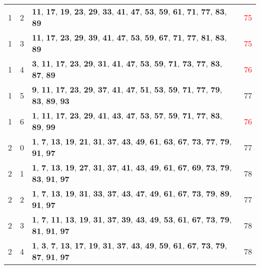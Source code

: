 \documentclass{article}
\begin{document}
\begin{tabular}{||c|c|l|c||}
	1&2&\textbf{11}, \textbf{17}, \textbf{19}, \textbf{23}, \textbf{29}, \textbf{33}, \textbf{41}, \textbf{47}, \textbf{53}, \textbf{59}, \textbf{61}, \textbf{71}, \textbf{77}, \textbf{83}, \textbf{89}&\textcolor{red}{75}\\
	1&3&\textbf{11}, \textbf{17}, \textbf{23}, \textbf{29}, \textbf{39}, \textbf{41}, \textbf{47}, \textbf{53}, \textbf{59}, \textbf{67}, \textbf{71}, \textbf{77}, \textbf{81}, \textbf{83}, \textbf{89}&\textcolor{red}{75}\\
	1&4&\textbf{3}, \textbf{11}, \textbf{17}, \textbf{23}, \textbf{29}, \textbf{31}, \textbf{41}, \textbf{47}, \textbf{53}, \textbf{59}, \textbf{71}, \textbf{73}, \textbf{77}, \textbf{83}, \textbf{87}, \textbf{89}&\textcolor{red}{76}\\
	1&5&\textbf{9}, \textbf{11}, \textbf{17}, \textbf{23}, \textbf{29}, \textbf{37}, \textbf{41}, \textbf{47}, \textbf{51}, \textbf{53}, \textbf{59}, \textbf{71}, \textbf{77}, \textbf{79}, \textbf{83}, \textbf{89}, \textbf{93}&77\\
	1&6&\textbf{1}, \textbf{11}, \textbf{17}, \textbf{23}, \textbf{29}, \textbf{41}, \textbf{43}, \textbf{47}, \textbf{53}, \textbf{57}, \textbf{59}, \textbf{71}, \textbf{77}, \textbf{83}, \textbf{89}, \textbf{99}&\textcolor{red}{76}\\
	2&0&\textbf{1}, \textbf{7}, \textbf{13}, \textbf{19}, \textbf{21}, \textbf{31}, \textbf{37}, \textbf{43}, \textbf{49}, \textbf{61}, \textbf{63}, \textbf{67}, \textbf{73}, \textbf{77}, \textbf{79}, \textbf{91}, \textbf{97}&77\\
	2&1&\textbf{1}, \textbf{7}, \textbf{13}, \textbf{19}, \textbf{27}, \textbf{31}, \textbf{37}, \textbf{41}, \textbf{43}, \textbf{49}, \textbf{61}, \textbf{67}, \textbf{69}, \textbf{73}, \textbf{79}, \textbf{83}, \textbf{91}, \textbf{97}&78\\
	2&2&\textbf{1}, \textbf{7}, \textbf{13}, \textbf{19}, \textbf{31}, \textbf{33}, \textbf{37}, \textbf{43}, \textbf{47}, \textbf{49}, \textbf{61}, \textbf{67}, \textbf{73}, \textbf{79}, \textbf{89}, \textbf{91}, \textbf{97}&77\\
	2&3&\textbf{1}, \textbf{7}, \textbf{11}, \textbf{13}, \textbf{19}, \textbf{31}, \textbf{37}, \textbf{39}, \textbf{43}, \textbf{49}, \textbf{53}, \textbf{61}, \textbf{67}, \textbf{73}, \textbf{79}, \textbf{81}, \textbf{91}, \textbf{97}&78\\
	2&4&\textbf{1}, \textbf{3}, \textbf{7}, \textbf{13}, \textbf{17}, \textbf{19}, \textbf{31}, \textbf{37}, \textbf{43}, \textbf{49}, \textbf{59}, \textbf{61}, \textbf{67}, \textbf{73}, \textbf{79}, \textbf{87}, \textbf{91}, \textbf{97}&78\\

\end{tabular}
\end{document}

